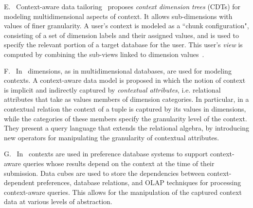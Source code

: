 \documentclass[format=acmsmall, review=false, screen=true]{acmart}
\newcommand{\ignore}[1]{}
\begin{document}
\noindent E. \ Context-aware data tailoring~\cite{bolchini-cdt} proposes {\em context dimension trees} (CDTs) for modeling multidimensional aspects of context. It allows sub-dimensions with values of finer granularity. A user's context is modeled as a  ``chunk configuration", consisting of a  set of dimension labels and their assigned values, and is used to specify the relevant portion of a target database for the user. This user's {\em view} is computed by combining the sub-views linked to dimension values~\cite{bolchini-view,bolchini-is}. %

\noindent F. \ In~\citep{martinenghi-vldb} dimensions, as in multidimensional databases, are used for modeling contexts. A context-aware data model is proposed in which the notion of context is implicit and indirectly captured by {\em contextual attributes}, i.e. relational attributes that take as values members of dimension categories. In particular, in a contextual relation the context of a tuple is captured by its values in dimensions, while the categories of these members specify the granularity level of the context. They present a query language that extends the relational algebra, by introducing new operators for manipulating the granularity of contextual attributes.%


\noindent G. \ In~\citep{pitoura11,stefanidis11} contexts are used in preference database systems to support context-aware queries whose results depend on the context at the time of their submission. Data cubes are used to store the dependencies between context-dependent preferences, database relations, and OLAP techniques for processing context-aware queries. This allows for the manipulation of the captured context data at various levels of abstraction. \ignore{To improve query performance, they use an auxiliary data structure, called context tree, that stores results of past context-aware queries indexed by the context of their execution.}
\end{document}

